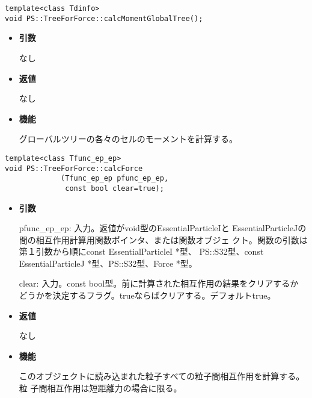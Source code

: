 
\begin{screen}
\begin{verbatim}
template<class Tdinfo>
void PS::TreeForForce::calcMomentGlobalTree();
\end{verbatim}
\end{screen}

\begin{itemize}

\item {\bf 引数}

なし

\item {\bf 返値}

なし

\item {\bf 機能}

グローバルツリーの各々のセルのモーメントを計算する。

\end{itemize}


\begin{screen}
\begin{verbatim}
template<class Tfunc_ep_ep>
void PS::TreeForForce::calcForce
             (Tfunc_ep_ep pfunc_ep_ep,
              const bool clear=true);
\end{verbatim}
\end{screen}

\begin{itemize}

\item {\bf 引数}

pfunc\_ep\_ep: 入力。返値がvoid型のEssentialParticleIと
EssentialParticleJの間の相互作用計算用関数ポインタ、または関数オブジェ
クト。関数の引数は第１引数から順にconst EssentialParticleI *型、
PS::S32型、const EssentialParticleJ *型、PS::S32型、Force *型。

clear: 入力。const bool型。前に計算された相互作用の結果をクリアするか
どうかを決定するフラグ。trueならばクリアする。デフォルトtrue。

\item {\bf 返値}

なし

\item {\bf 機能}

このオブジェクトに読み込まれた粒子すべての粒子間相互作用を計算する。粒
子間相互作用は短距離力の場合に限る。

\end{itemize}


